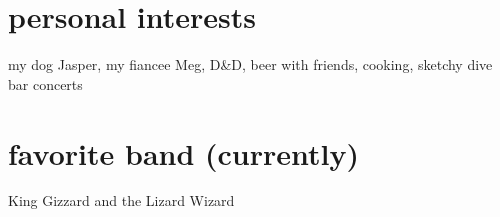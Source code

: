 
\begin{aside} %
\section{personal interests}
my dog Jasper, my fiancee Meg, D\&D, beer with friends, cooking, sketchy dive bar concerts
~
\section{favorite band (currently)}
King Gizzard and the Lizard Wizard
~
\end{aside}
